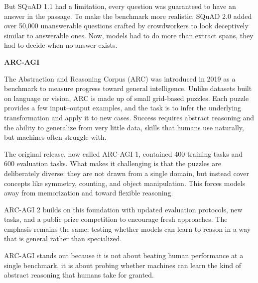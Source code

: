 But SQuAD 1.1 had a limitation, every question was guaranteed to have an answer in the passage. To make the benchmark more realistic, SQuAD 2.0
added over 50,000 unanswerable questions crafted by crowdworkers to look deceptively similar to answerable ones. Now, models had to do more
than extract spans, they had to decide when no answer exists.

\textbf{ARC-AGI}


The Abstraction and Reasoning Corpus (ARC) was introduced in 2019 as a benchmark to measure progress toward general intelligence. Unlike datasets 
built on language or vision, ARC is made up of small grid-based puzzles. Each puzzle provides a few input–output examples, and the task is to infer
the underlying transformation and apply it to new cases. Success requires abstract reasoning and the ability to generalize from very little
data, skills that humans use naturally, but machines often struggle with.

The original release, now called ARC-AGI 1, contained 400 training tasks and 600 evaluation tasks. What makes it challenging is that
the puzzles are deliberately diverse: they are not drawn from a single domain, but instead cover concepts like symmetry, counting, and object
manipulation. This forces models away from memorization and toward flexible reasoning.

ARC-AGI 2 builds on this foundation with updated evaluation protocols, new tasks, and a public prize competition to encourage fresh approaches.
The emphasis remains the same: testing whether models can learn to reason in a way that is general rather than specialized.

ARC-AGI stands out because it is not about beating human performance at a single benchmark, it is about probing whether machines can learn the
kind of abstract reasoning that humans take for granted.